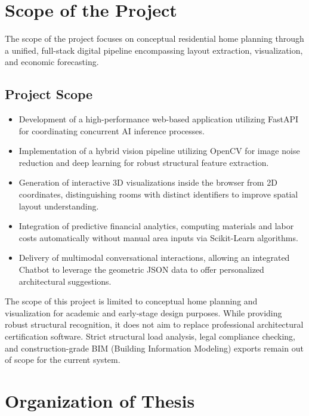 \documentclass[12pt]{report}
\begin{document}
\section{Scope of the Project}

The scope of the project focuses on conceptual residential home planning through a unified, full-stack digital pipeline encompassing layout extraction, visualization, and economic forecasting\cite{eastman2018}.

\subsection{Project Scope}

\begin{itemize}
  \item Development of a high-performance web-based application utilizing FastAPI for coordinating concurrent AI inference processes\cite{fastapi2024}.
  \item Implementation of a hybrid vision pipeline utilizing OpenCV for image noise reduction\cite{opencv2024} and deep learning for robust structural feature extraction\cite{ronneberger2015}.
  \item Generation of interactive 3D visualizations inside the browser from 2D coordinates\cite{threejs2024}, distinguishing rooms with distinct identifiers to improve spatial layout understanding.
  \item Integration of predictive financial analytics, computing materials and labor costs automatically without manual area inputs via Scikit-Learn algorithms\cite{sklearn2024, wang2020}.
  \item Delivery of multimodal conversational interactions, allowing an integrated Chatbot to leverage the geometric JSON data to offer personalized architectural suggestions\cite{groq2024, vaswani2017}.
\end{itemize}

The scope of this project is limited to conceptual home planning and visualization for academic and early-stage design purposes. While providing robust structural recognition, it does not aim to replace professional architectural certification software\cite{eastman2018}. Strict structural load analysis, legal compliance checking, and construction-grade BIM (Building Information Modeling) exports remain out of scope for the current system.

\section{Organization of Thesis}
\end{document}

